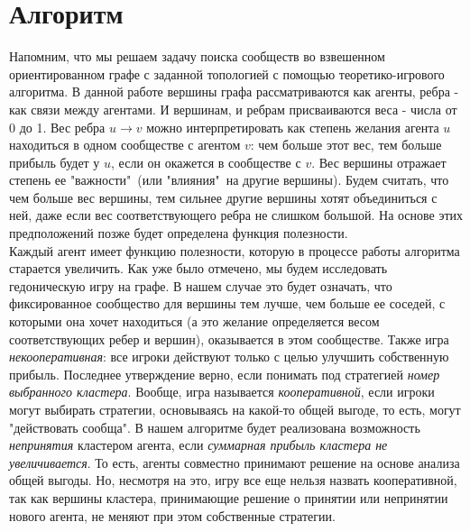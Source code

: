 \chapter{Алгоритм}
Напомним, что мы решаем задачу поиска сообществ во взвешенном ориентированном графе с заданной топологией с помощью теоретико-игрового алгоритма. В данной работе вершины графа рассматриваются как агенты, ребра - как связи между агентами. И вершинам, и ребрам присваиваются веса - числа от 0 до 1. Вес ребра $u\rightarrow v$ можно интерпретировать как степень желания агента $u$ находиться в одном сообществе с агентом $v$: чем больше этот вес, тем больше прибыль будет у $u$, если он окажется в сообществе с $v$. Вес вершины отражает степень ее "важности"\ (или "влияния"\ на другие вершины). Будем считать, что чем больше вес вершины, тем сильнее другие вершины хотят объединиться с ней, даже если вес соответствующего ребра не слишком большой. На основе этих предположений позже будет определена функция полезности.\\

Каждый агент имеет функцию полезности, которую в процессе работы алгоритма старается увеличить. Как уже было отмечено, мы будем исследовать гедоническую игру на графе. В нашем случае это будет означать, что фиксированное сообщество для вершины тем лучше, чем больше ее соседей, с которыми она хочет находиться (а это желание определяется весом соответствующих ребер и вершин), оказывается в этом сообществе. Также игра \textit{некооперативная}: все игроки действуют только с целью улучшить собственную прибыль. Последнее утверждение верно, если понимать под стратегией \textit{номер выбранного кластера}. Вообще, игра называется \textit{кооперативной}, если игроки могут выбирать стратегии, основываясь на какой-то общей выгоде, то есть, могут "действовать сообща". В нашем алгоритме будет реализована возможность \textit{непринятия} кластером агента, если \textit{суммарная прибыль кластера не увеличивается}. То есть, агенты совместно принимают решение на основе анализа общей выгоды. Но, несмотря на это, игру все еще нельзя назвать кооперативной, так как вершины кластера, принимающие решение о принятии или непринятии нового агента, не меняют при этом собственные стратегии.

